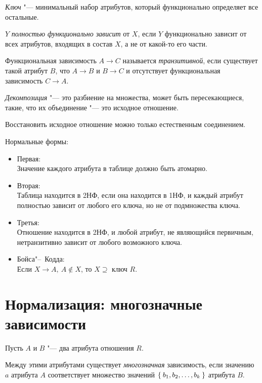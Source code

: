\begin{definition}
	\emph{Ключ} "--- минимальный набор атрибутов, который функционально определяет все остальные.
\end{definition}

\begin{definition}
	$ Y $ \emph{полностью функционально зависит} от $ X $, если $ Y $ функционально зависит от всех атрибутов, входящих в состав $ X $, а не от какой-то его части.
\end{definition}

\begin{definition}
	Функциональная зависимость $ A \to C $ называется \emph{транзитивной}, если существует такой атрибут $ B $, что $ A \to B $ и $ B \to C $ и отсутствует функциональная зависимость $ C \to A $.
\end{definition}

\begin{definition}
	\emph{Декомпозиция} "--- это разбиение на множества, может быть пересекающиеся, такие, что их объединение "--- это исходное отношение.
\end{definition}

Восстановить исходное отношение можно только естественным соединением.

Нормальные формы:
\begin{itemize}
	\item Первая: \\
		Значение каждого атрибута в таблице должно быть атомарно.
	\item Вторая: \\
		Таблица находится в 2НФ, если она находится в 1НФ, и каждый атрибут полностью зависит от любого его ключа, но не от подмножества ключа.
	\item Третья: \\
		Отношение находится в 2НФ, и любой атрибут, не являющийся первичным, нетранзитивно зависит от любого возможного ключа.
	\item Бойса"--~Кодда: \\
		Если $ X \to A, ~ A \not\in X $, то $ X \supseteq $ ключ $ R $.
\end{itemize}

\section{Нормализация: многозначные зависимости}

\begin{definition}
	Пусть $ A $ и $ B $ "--- два атрибута отношения $ R $.

	Между этими атрибутами существует \emph{многозначная} зависимость, если значению $ a $ атрибута $ A $ соответствует множество значений $ \Set{b_1, b_2, \dots, b_k} $ атрибута $ B $.
\end{definition}

